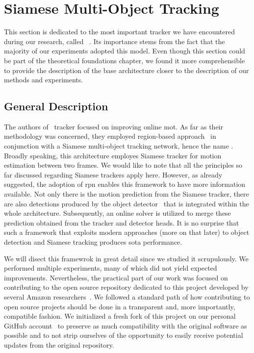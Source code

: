 \section{Siamese Multi-Object Tracking}
\label{sec:SiamMOT}

This section is dedicated to the most important tracker we have encountered during our research, called \siammot{}~\cite{shuai2021siammot}. Its importance stems from the fact that the majority of our experiments adopted this model. Even though this section could be part of the theoretical foundations chapter, we found it more comprehensible to provide the description of the base architecture closer to the description of our methods and experiments.

\subsection{General Description}

The authors of~\cite{shuai2021siammot} tracker focused on improving online \gls{mot}. As far as their methodology was concerned, they employed region-based approach~\cite{ren2017fasterrcnn} in conjunction with a Siamese multi-object tracking network, hence the name \siammot{}. Broadly speaking, this architecture employes Siamese tracker for motion estimation between two frames. We would like to note that all the principles so far discussed regarding Siamese trackers apply here. However, as already suggested, the adoption of \gls{rpn} enables this framework to have more information available. Not only there is the motion prediction from the Siamese tracker, there are also detections produced by the \fasterrcnn{} object detector~\cite{ren2017fasterrcnn} that is integrated within the whole architecture. Subsequently, an online solver is utilized to merge these prediction obtained from the tracker and detector heads. It is no surprise that such a framework that exploits modern approaches (more on that later) to object detection and Siamese tracking produces \gls{sota} performance.

We will disect this framewrok in great detail since we studied it scrupulously. We performed multiple experiments, many of which did not yield expected improvements. Nevertheless, the practical part of our work was focused on contributing to the open source repository dedicated to this project developed by several Amazon researchers~\cite{websiammotoriggithub}. We followed a standard path of how contributing to open source projects should be done in a transparent and, more importantly, compatible fashion. We initialized a fresh fork of this project on our personal GitHub account~\cite{websiammotforkgithub} to preserve as much compatibility with the original software as possible and to not strip ourselves of the opportunity to easily receive potential updates from the original repository.

